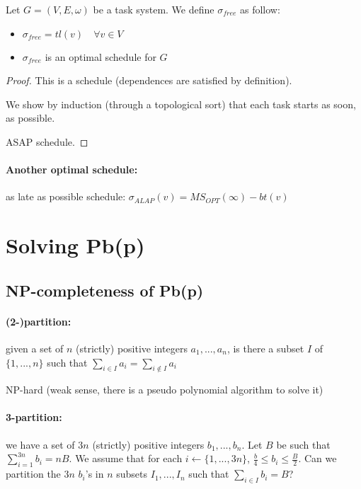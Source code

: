 \begin{thm}
Let $G=(V,E,\omega)$ be a task system. We define $\sigma_{free}$ as follow:
\begin{itemize}
\item $\sigma_{free}=tl(v) \quad \forall v \in V$
\item $\sigma_{free}$ is an optimal schedule for $G$
\end{itemize}
\end{thm}
\begin{proof}
This is a schedule (dependences are satisfied by definition).

We show by induction (through a topological sort) that each task starts as soon, as possible.

ASAP schedule.
\end{proof}

\paragraph{Another optimal schedule:} as late as possible schedule: $\sigma_{ALAP}(v)=MS_{OPT}(\infty) - bt(v)$

\section{Solving Pb(p)}
\subsection{NP-completeness of Pb(p)}

\paragraph{(2-)partition:} given a set of $n$ (strictly) positive integers $a_1,...,a_n$, is there a subset $I$ of $\{1,...,n\}$ such that $\sum_{i\in I} a_i=\sum_{i\notin I}a_i$

NP-hard (weak sense, there is a pseudo polynomial algorithm to solve it)


\paragraph{3-partition:} we have a set of $3n$ (strictly) positive integers $b_1,...,b_n$. Let $B$ be such that $\sum_{i=1}^{3n}b_i=nB$. We assume that for each $i\leftarrow \{ 1,...,3n\}$, $\frac{b}{4}\leq b_i \leq \frac{B}{2}$. Can we partition the $3n$ $b_i$'s in $n$ subsets $I_1, ..., I_n$ such that $\sum_{i\in I} b_i = B$?

